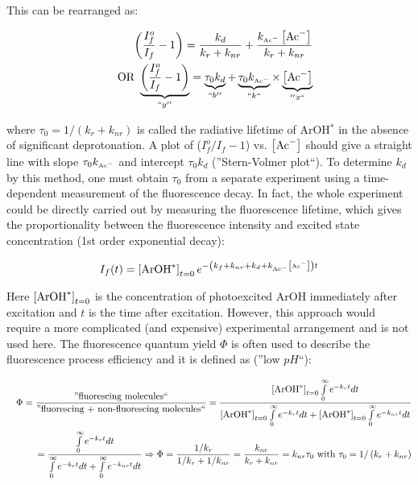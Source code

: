 \documentclass[byrevtex,amssymb,aps,pra,floatfix,letterpaper]{revtex4}
\begin{document}
\noindent
This can be rearranged as:

\begin{eqnarray}
\label{eq13}
& & \left(\frac{I_f^o}{I_f} - 1\right) = \frac{k_d}{k_r + k_{nr}} + \frac{k_{\textnormal{\tiny Ac}^-}\left[\textnormal{Ac}^-\right]}{k_r + k_{nr}}\\
\nonumber
& & \textnormal{OR }\underbrace{\left(\frac{I_f^o}{I_f} - 1\right)}_{``y''} = \underbrace{\tau_0k_d}_{``b''} + \underbrace{\tau_0k_{\textnormal{\tiny Ac}^-}}_{``k``}\times\underbrace{\left[\textnormal{Ac}^-\right]}_{''x``}
\end{eqnarray}

\noindent
where $\tau_0 = 1 / (k_r + k_{nr})$ is called the radiative lifetime of ArOH$^*$ in the absence of significant deprotonation. A plot of ($I_f^o / I_f - 1$) vs. $\left[\textnormal{Ac}^-\right]$ should give a straight line with slope $\tau_0k_{\textnormal{\tiny Ac}^-}$ and intercept $\tau_0k_d$ (''Stern-Volmer plot``). To determine $k_d$ by this method, one must obtain $\tau_0$ from a separate experiment using a time-dependent measurement of the fluorescence decay. In fact, the whole experiment could be directly carried out by measuring the fluorescence lifetime, which gives the proportionality between the fluorescence intensity and excited state concentration (1st order exponential decay):

\begin{equation}
I_f(t) = \left[\textnormal{ArOH}^*\right]_{t=0}e^{-\left(k_f + k_{nr} + k_d + k_{\textnormal{\tiny Ac}^-}\left[\textnormal{\tiny Ac}^-\right]\right)t}
\label{eq14}
\end{equation}

\noindent
Here $\left[\textnormal{ArOH}^*\right]_{t=0}$ is the concentration of photoexcited ArOH immediately after excitation and $t$ is the time after excitation. However, this approach would require a more complicated (and expensive) experimental arrangement and is not used here. The fluorescence quantum yield $\Phi$ is often used to describe the fluorescence process efficiency and it is defined as (''low $pH$``):

\begin{eqnarray}
\label{eq15}
& & \Phi = \frac{\textnormal{''fluorescing molecules``}}{\textnormal{''fluorescing + non-fluorescing molecules``}} =
\frac{\left[\textnormal{ArOH}^*\right]_{t=0}\int\limits_0^\infty e^{-k_r t}dt}{\left[\textnormal{ArOH}^*\right]_{t=0}\int\limits_0^\infty e^{-k_r t}dt + \left[\textnormal{ArOH}^*\right]_{t=0}\int\limits_0^\infty e^{-k_{nr}t}dt}\\
\nonumber
& & = \frac{\int\limits_0^\infty e^{-k_r t}dt}{\int\limits_0^\infty e^{-k_r t}dt + \int\limits_0^\infty e^{-k_{nr}t}dt} \Rightarrow \Phi = \frac{1/k_r}{1/k_r + 1/k_{nr}}
= \frac{k_{nr}}{k_r + k_{nr}} = k_{nr}\tau_0\textnormal{ with }\tau_0 = 1/\left(k_r + k_{nr}\right)
\end{eqnarray}
\end{document}
